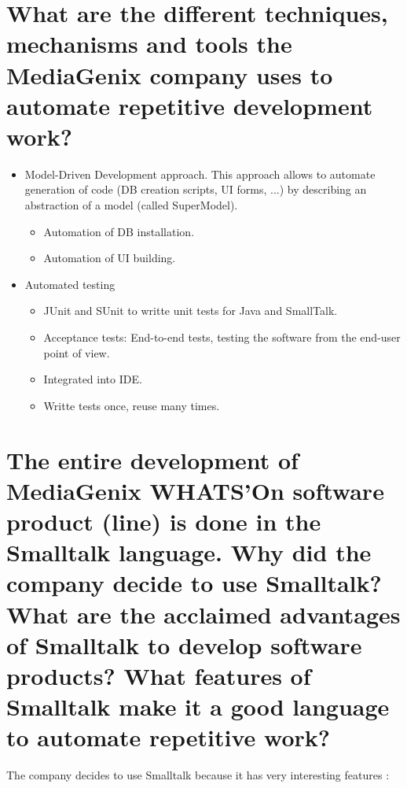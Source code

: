 \section{What are the different techniques, mechanisms and tools the MediaGenix company
uses to automate repetitive development work?}

\begin{itemize}
\item Model-Driven Development approach. This approach allows to automate generation of code (DB creation scripts, UI forms, ...) by describing an abstraction of a model (called SuperModel).
    \begin{itemize}
    \item Automation of DB installation.
    \item Automation of UI building.
    \end{itemize}
\item Automated testing
    \begin{itemize}
    \item JUnit and SUnit to writte unit tests for Java and SmallTalk.
    \item Acceptance tests: End-to-end tests, testing the software from the end-user point of view.
    \item Integrated into IDE.
    \item Writte tests once, reuse many times.
    \end{itemize}
\end{itemize}


\section{The entire development of MediaGenix WHATS'On software product (line) is done in
the Smalltalk language.
Why did the company decide to use Smalltalk?
What are the acclaimed advantages of Smalltalk to develop software products?
What features of Smalltalk make it a good language to automate repetitive work?}

The company decides to use Smalltalk because it has very interesting features : 

